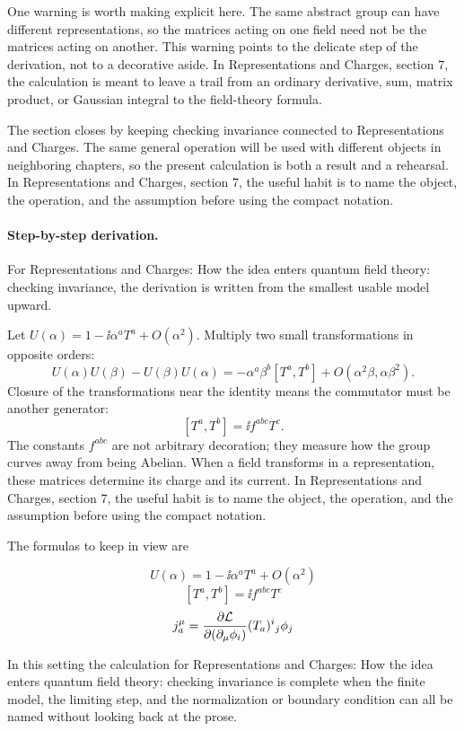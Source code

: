 One warning is worth making explicit here.  The same abstract group can have different representations, so the matrices acting on one field need not be the matrices acting on another.  This warning points to the delicate step of the derivation, not to a decorative aside.  In Representations and Charges, section 7, the calculation is meant to leave a trail from an ordinary derivative, sum, matrix product, or Gaussian integral to the field-theory formula.

The section closes by keeping checking invariance connected to Representations and Charges.  The same general operation will be used with different objects in neighboring chapters, so the present calculation is both a result and a rehearsal.  In Representations and Charges, section 7, the useful habit is to name the object, the operation, and the assumption before using the compact notation.



\paragraph{Step-by-step derivation.}

For Representations and Charges: How the idea enters quantum field theory: checking invariance, the derivation is written from the smallest usable model upward.

Let \(U(\alpha)=1-\ii\alpha^aT^a+O(\alpha^2)\).  Multiply two small transformations in opposite orders:
\[
  U(\alpha)U(\beta)-U(\beta)U(\alpha)
  =
  -\alpha^a\beta^b[T^a,T^b]+O(\alpha^2\beta,\alpha\beta^2).
\]
Closure of the transformations near the identity means the commutator must be another generator:
\[
  [T^a,T^b]=\ii f^{abc}T^c.
\]
The constants \(f^{abc}\) are not arbitrary decoration; they measure how the group curves away from being Abelian.  When a field transforms in a representation, these matrices determine its charge and its current.  In Representations and Charges, section 7, the useful habit is to name the object, the operation, and the assumption before using the compact notation.

The formulas to keep in view are

\[
  U(\alpha)=1-\ii\alpha^aT^a+O(\alpha^2)
\]
\[
  [T^a,T^b]=\ii f^{abc}T^c
\]
\[
  j^\mu_a=\frac{\partial\mathcal L}{\partial(\partial_\mu\phi_i)}(T_a)^i{}_j\phi_j
\]

In this setting the calculation for Representations and Charges: How the idea enters quantum field theory: checking invariance is complete when the finite model, the limiting step, and the normalization or boundary condition can all be named without looking back at the prose.




